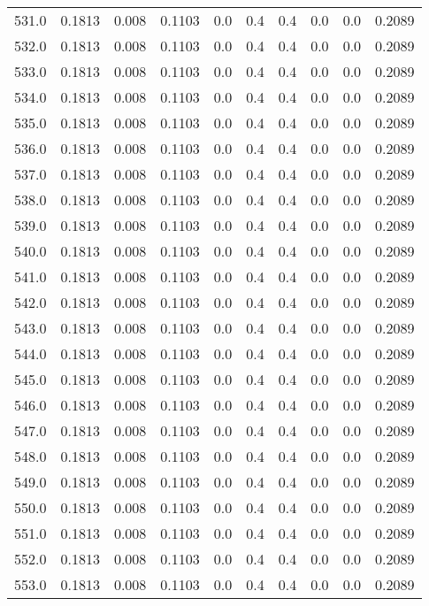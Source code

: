 \begin{longtable}{lrrrrrrrrr}
531.0 & 0.1813 & 0.008 & 0.1103 & 0.0 & 0.4 & 0.4 & 0.0 & 0.0 & 0.2089 \\
532.0 & 0.1813 & 0.008 & 0.1103 & 0.0 & 0.4 & 0.4 & 0.0 & 0.0 & 0.2089 \\
533.0 & 0.1813 & 0.008 & 0.1103 & 0.0 & 0.4 & 0.4 & 0.0 & 0.0 & 0.2089 \\
534.0 & 0.1813 & 0.008 & 0.1103 & 0.0 & 0.4 & 0.4 & 0.0 & 0.0 & 0.2089 \\
535.0 & 0.1813 & 0.008 & 0.1103 & 0.0 & 0.4 & 0.4 & 0.0 & 0.0 & 0.2089 \\
536.0 & 0.1813 & 0.008 & 0.1103 & 0.0 & 0.4 & 0.4 & 0.0 & 0.0 & 0.2089 \\
537.0 & 0.1813 & 0.008 & 0.1103 & 0.0 & 0.4 & 0.4 & 0.0 & 0.0 & 0.2089 \\
538.0 & 0.1813 & 0.008 & 0.1103 & 0.0 & 0.4 & 0.4 & 0.0 & 0.0 & 0.2089 \\
539.0 & 0.1813 & 0.008 & 0.1103 & 0.0 & 0.4 & 0.4 & 0.0 & 0.0 & 0.2089 \\
540.0 & 0.1813 & 0.008 & 0.1103 & 0.0 & 0.4 & 0.4 & 0.0 & 0.0 & 0.2089 \\
541.0 & 0.1813 & 0.008 & 0.1103 & 0.0 & 0.4 & 0.4 & 0.0 & 0.0 & 0.2089 \\
542.0 & 0.1813 & 0.008 & 0.1103 & 0.0 & 0.4 & 0.4 & 0.0 & 0.0 & 0.2089 \\
543.0 & 0.1813 & 0.008 & 0.1103 & 0.0 & 0.4 & 0.4 & 0.0 & 0.0 & 0.2089 \\
544.0 & 0.1813 & 0.008 & 0.1103 & 0.0 & 0.4 & 0.4 & 0.0 & 0.0 & 0.2089 \\
545.0 & 0.1813 & 0.008 & 0.1103 & 0.0 & 0.4 & 0.4 & 0.0 & 0.0 & 0.2089 \\
546.0 & 0.1813 & 0.008 & 0.1103 & 0.0 & 0.4 & 0.4 & 0.0 & 0.0 & 0.2089 \\
547.0 & 0.1813 & 0.008 & 0.1103 & 0.0 & 0.4 & 0.4 & 0.0 & 0.0 & 0.2089 \\
548.0 & 0.1813 & 0.008 & 0.1103 & 0.0 & 0.4 & 0.4 & 0.0 & 0.0 & 0.2089 \\
549.0 & 0.1813 & 0.008 & 0.1103 & 0.0 & 0.4 & 0.4 & 0.0 & 0.0 & 0.2089 \\
550.0 & 0.1813 & 0.008 & 0.1103 & 0.0 & 0.4 & 0.4 & 0.0 & 0.0 & 0.2089 \\
551.0 & 0.1813 & 0.008 & 0.1103 & 0.0 & 0.4 & 0.4 & 0.0 & 0.0 & 0.2089 \\
552.0 & 0.1813 & 0.008 & 0.1103 & 0.0 & 0.4 & 0.4 & 0.0 & 0.0 & 0.2089 \\
553.0 & 0.1813 & 0.008 & 0.1103 & 0.0 & 0.4 & 0.4 & 0.0 & 0.0 & 0.2089 \\

\end{longtable}
